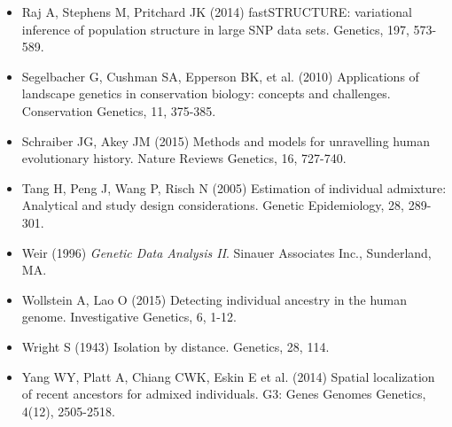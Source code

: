 \begin{itemize}
\item[] Raj A, Stephens M, Pritchard JK (2014) fastSTRUCTURE: variational inference of population structure in large SNP data sets. Genetics, 197, 573-589.

\item[] Segelbacher G, Cushman SA, Epperson BK, et al. (2010) Applications of landscape genetics in conservation biology: concepts and challenges. Conservation Genetics, 11, 375-385.

\item[] Schraiber JG, Akey JM (2015) Methods and models for unravelling human evolutionary history. Nature Reviews Genetics, 16, 727-740.

\item[] Tang H, Peng J, Wang P, Risch N (2005) Estimation of individual admixture: Analytical and study design considerations. Genetic Epidemiology, 28, 289-301.

\item[] Weir (1996) {\it Genetic Data Analysis II}. Sinauer Associates Inc., Sunderland, MA.

\item[] Wollstein A, Lao O (2015) Detecting individual ancestry in the human genome. Investigative Genetics, 6, 1-12.

\item[] Wright S (1943) Isolation by distance. Genetics, 28, 114.

\item[] Yang WY, Platt A, Chiang CWK, Eskin E et al. (2014) Spatial localization of recent ancestors for admixed individuals. G3: Genes Genomes Genetics, 4(12), 2505-2518.


\end{itemize}
